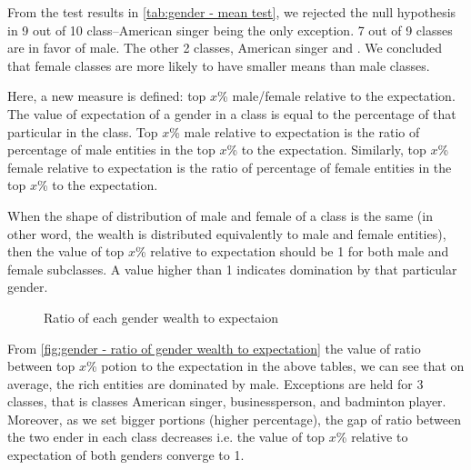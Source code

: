 From the test results in \autoref{tab:gender - mean test}, we rejected the null hypothesis in 9 out of 10 class--American singer being the only exception. 7 out of 9 classes are in favor of male. The other 2 classes, American singer and . We concluded that female classes are more likely to have smaller means than male classes.

Here, a new measure is defined: top \(x\)\% male/female relative to the expectation. The value of expectation of a gender in a class is equal to the percentage of that particular in the class. Top \(x\)\% male relative to expectation is the ratio of percentage of male entities in the top \(x\)\% to the expectation. Similarly, top \(x\)\% female relative to expectation is the ratio of percentage of female entities in the top \(x\)\% to the expectation.

When the shape of distribution of male and female of a class is the same (in other word, the wealth is distributed equivalently to male and female entities), then the value of top \(x\)\% relative to expectation should be 1 for both male and female subclasses. A value higher than 1 indicates domination by that particular gender.

\begin{figure}[!h]
\centering 
{}


\caption{Ratio of each gender wealth to expectaion} \label{fig:gender - ratio of gender wealth to expectation}

\end{figure}

From \autoref{fig:gender - ratio of gender wealth to expectation} the value of ratio between top \(x\)\% potion to the expectation in the above tables, we can see that on average, the rich entities are dominated by male. Exceptions are held for 3 classes, that is classes American singer, businessperson, and badminton player. Moreover, as we set bigger portions (higher percentage), the gap of ratio between the two ender in each class decreases i.e. the value of top \(x\)\% relative to expectation of both genders converge to 1.